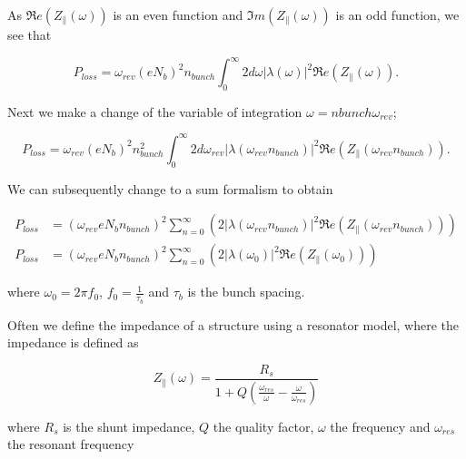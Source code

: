 As $\Re{}e\left(Z_{\parallel} \left( \omega\right)\right)$ is an even function and $\Im{}m\left(Z_{\parallel} \left( \omega\right)\right)$ is an odd function, we see that

\begin{equation}
P_{loss}   =  \omega_{rev} \left( eN_{b}   \right)^{2}n_{bunch} \int^{\infty}_{0} 2 d\omega \left| \lambda \left( \omega \right)  \right| ^{2}  \Re{}e \left( Z_{\parallel} \left( \omega\right)  \right).
\end{equation}

Next we make a change of the variable of integration $\omega = n{bunch}\omega_{rev}$;

\begin{equation}
P_{loss}   =  \omega_{rev} \left( eN_{b}   \right)^{2}n_{bunch}^{2} \int^{\infty}_{0} 2 d\omega_{rev} \left| \lambda \left( \omega_{rev}n_{bunch} \right)  \right|^{2}  \Re{}e \left( Z_{\parallel} \left( \omega_{rev}n_{bunch}\right)  \right).
\end{equation}

We can subsequently change to a sum formalism to obtain

\begin{align}
P_{loss} & = \left( \omega_{rev}eN_{b}n_{bunch}  \right)^{2} \displaystyle\sum\limits_{n = 0}^{\infty} \left( 2 \left| \lambda \left( \omega_{rev}n_{bunch} \right)  \right|^{2}  \Re{}e \left( Z_{\parallel} \left( \omega_{rev}n_{bunch}\right) \right) \right) \label{ean:heating-gen} \\
P_{loss} & = \left( \omega_{rev}eN_{b}n_{bunch}  \right)^{2} \displaystyle\sum\limits_{n = 0}^{\infty} \left( 2 \left| \lambda \left( \omega_{0} \right)  \right|^{2}  \Re{}e \left( Z_{\parallel} \left( \omega_{0}\right) \right) \right)
\end{align}

where $\omega_{0} = 2\pi f_{0}$, $f_{0} = \frac{1}{\tau_{b}}$ and $\tau_{b}$ is the bunch spacing.

Often we define the impedance of a structure using a resonator model, where the impedance is defined as

\begin{equation}
Z_{\parallel}\left( \omega \right) = \frac{R_{s}}{1 + Q\left( \frac{\omega_{res}}{\omega} - \frac{\omega}{\omega_{res}} \right)}
\end{equation}

where $R_{s}$ is the shunt impedance, $Q$ the quality factor, $\omega$ the frequency and $\omega_{res}$ the resonant frequency

